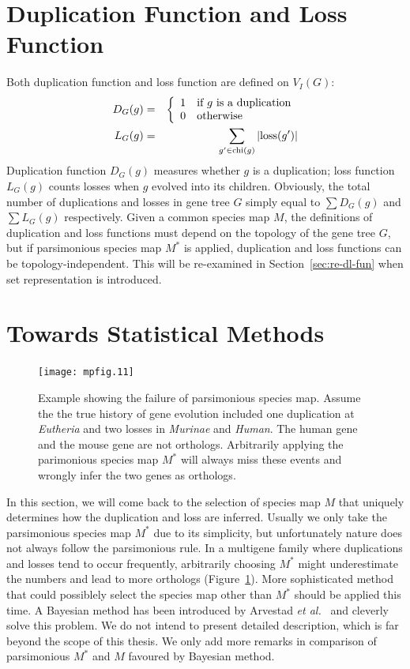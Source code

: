\section{Duplication Function and Loss Function}\label{sec:dl-fun}
Both duplication function and loss function are defined on $V_I(G)$:
\begin{eqnarray}\label{equ:dl-fun}
D_G(g) &=& \left\{\begin{array}{ll}
	1 & \mbox{if $g$ is a duplication} \\
	0 & \mbox{otherwise}\end{array}\right. \\
L_G(g) &=& \sum_{g'\in\mathrm{chi}(g)}{|\mathrm{loss}(g')|}
\end{eqnarray}
Duplication function $D_G(g)$ measures whether $g$ is a duplication; loss function $L_G(g)$
counts losses when $g$ evolved into its children. Obviously, the total number of duplications and
losses in gene tree $G$ simply equal to $\sum D_G(g)$ and $\sum L_G(g)$ respectively.
Given a common species map $M$, the definitions of duplication and loss
functions must depend on the topology of the gene tree $G$, but if parsimonious species map
$M^*$ is applied, duplication and loss functions can be topology-independent.
This will be re-examined in Section~\ref{sec:re-dl-fun} when set representation is introduced.

\section{Towards Statistical Methods}

\begin{figure}[!hb]
\begin{center}
\texttt{[image: mpfig.11]}
\caption[Example showing the failure of parsimonious species map]
{Example showing the failure of parsimonious species map. Assume the
the true history of gene evolution included one duplication at {\it Eutheria} and two losses in
{\it Murinae} and {\it Human}. The human gene and the mouse gene are not orthologs. Arbitrarily applying the
parimonious species map $M^*$ will always miss these events and wrongly infer the two genes as orthologs.}\label{fig:bad-pars}
\end{center}
\end{figure}

In this section, we will come back to the selection of species map $M$ that
uniquely determines how the duplication and loss are inferred. Usually we only take
the parsimonious species map $M^*$ due to its simplicity, but unfortunately nature does not always
follow the parsimonious rule. In a multigene family
where duplications and losses tend to occur frequently, arbitrarily choosing $M^*$ might
underestimate the numbers and lead to more orthologs (Figure~\ref{fig:bad-pars}). More
sophisticated method that could possiblely select the species map other than $M^*$
should be applied this time. A Bayesian method has been introduced by
Arvestad {\it et al.}~\cite{arvestad03,arvestad04} and cleverly solve this problem.
We do not intend to present detailed description, which is far beyond the
scope of this thesis. We only add more remarks in comparison of parsimonious $M^*$ and
$M$ favoured by Bayesian method.

